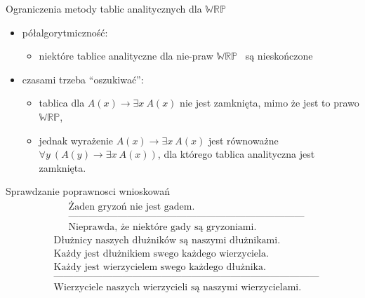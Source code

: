 \documentclass{beamer}
\newcommand {\WRP} {\ensuremath{\mathbb{WRP}}}
\begin{document}
\begin{frame}{Ograniczenia metody tablic analitycznych dla \WRP}
%
\begin{itemize}
\item półalgorytmiczność:
\begin{itemize}
\item niektóre tablice analityczne dla nie-praw \WRP~ są nieskończone
\end{itemize}
%
\item czasami trzeba ``oszukiwać'':
%
\begin{itemize}
\item tablica dla $A(x) \to \exists x~ A(x)$ nie jest zamknięta, mimo że jest to prawo \WRP,
%
\item jednak wyrażenie $A(x) \to \exists x~ A(x)$ jest równoważne $\forall y ~(A(y) \to \exists x~ A(x))$, dla którego tablica analityczna jest zamknięta.
\end{itemize}
\end{itemize}
\end{frame}

\begin{frame}{Sprawdzanie poprawnosci wnioskowań}
%
\begin{eqnarray*}
& \textrm{Żaden gryzoń nie jest gadem.} \nonumber \\
& \textrm{------------------------------------------------------------------------}\nonumber \\
& \textrm{Nieprawda, że niektóre gady są gryzoniami.}
\end{eqnarray*}
%
\begin{eqnarray*}
& \textrm{Dłużnicy naszych dłużników są naszymi dłużnikami.}\nonumber \\
& \textrm{Każdy jest dłużnikiem swego każdego wierzyciela.}\nonumber \\
& \textrm{Każdy jest wierzycielem swego każdego dłużnika.}\nonumber \\
& \textrm{---------------------------------------------------------------------------------}\nonumber \\
& \textrm{Wierzyciele naszych wierzycieli są naszymi wierzycielami.}
\end{eqnarray*}
\end{frame}
\end{document}
